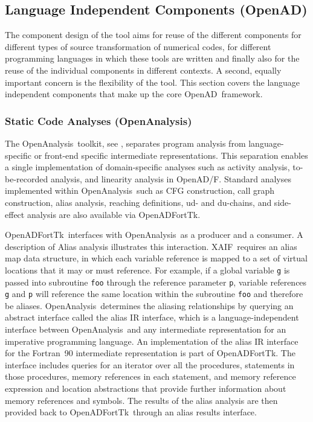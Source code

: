 \documentclass[11pt]{article}
\newcommand{\OpenADF}{OpenAD/F}
\newcommand{\OpenAD}{OpenAD}
\newcommand{\OpenADFortTk}{OpenADFortTk}
\newcommand{\OpenAnalysis}{OpenAnalysis}
\newcommand{\xaif}{XAIF}
\begin{document}
\subsection{Language Independent Components (\OpenAD)}\label{ssec:openadcomponents}

The component design of the tool aims for reuse of the different components 
for different types of source transformation of numerical codes, for 
different programming languages in which these tools are written and finally 
also for the reuse of the individual components in different contexts. 
A second, equally important concern is the flexibility of the tool.  
This section covers the language independent components that make up the core \OpenAD\ framework. 

\subsubsection{Static Code Analyses (\OpenAnalysis)} \label{sssec:openanalysis}

The \OpenAnalysis\ toolkit, see \cite{oaWeb}, separates program
analysis from language-specific or front-end specific intermediate
representations.  This separation enables a single implementation of
domain-specific analyses such as activity analysis, to-be-recorded
analysis, and linearity analysis in \OpenADF.  Standard analyses
implemented within \OpenAnalysis\ such as CFG construction, call graph
construction, alias analysis, reaching definitions, ud- and du-chains,
and side-effect analysis are also available via
\OpenADFortTk.

\OpenADFortTk\ interfaces with \OpenAnalysis\ as a producer and a
consumer.  A description of Alias analysis illustrates this
interaction.  \xaif\ requires an alias map data structure, in which
each variable reference is mapped to a set of virtual locations that
it may or must reference.  For example, if a global variable {\tt g}
is passed into subroutine {\tt foo} through the reference parameter
{\tt p}, variable references {\tt g} and {\tt p} will reference the
same location within the subroutine {\tt foo} and therefore be aliases.  
\OpenAnalysis\ determines the aliasing relationships by querying an
abstract interface called the alias IR interface, which is a 
language-independent interface between \OpenAnalysis\ and any
intermediate representation for an imperative programming language.  
An implementation of the alias IR interface for the Fortran~90
intermediate representation is part of
\OpenADFortTk.  The interface includes queries for an iterator over
all the procedures, statements in those procedures, memory references
in each statement, and memory reference expression and location
abstractions that provide further information about memory references
and symbols.  The results of the alias analysis are then provided back
to \OpenADFortTk\ through an alias results interface.
\end{document}
